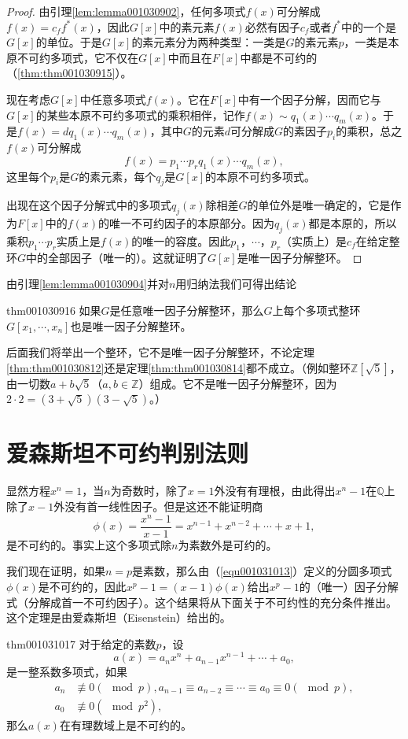 \begin{proof}
由引理\ref{lem:lemma001030902}，任何多项式$f(x)$可分解成$f(x)=c_ff^*(x)$，因此$G[x]$中的素元素$f(x)$必然有因子$c_f$或者$f^*$中的一个是$G[x]$的单位。于是$G[x]$的素元素分为两种类型：一类是$G$的素元素$p$，一类是本原不可约多项式，它不仅在$G[x]$中而且在$F[x]$中都是不可约的（\ref{thm:thm001030915}）。

现在考虑$G[x]$中任意多项式$f(x)$。它在$F[x]$中有一个因子分解，因而它与$G[x]$的某些本原不可约多项式的乘积相伴，记作$f(x)\sim q_1(x)\cdots q_m(x)$。于是$f(x)=dq_1(x)\cdots q_m(x)$，其中$G$的元素$d$可分解成$G$的素因子$p_i$的乘积，总之$f(x)$可分解成
\[
f(x)=p_1 \cdots p_rq_1(x)\cdots q_m(x),
\]
这里每个$p_i$是$G$的素元素，每个$q_j$是$G[x]$的本原不可约多项式。

出现在这个因子分解式中的多项式$q_j(x)$除相差$G$的单位外是唯一确定的，它是作为$F[x]$中的$f(x)$的唯一不可约因子的本原部分。因为$q_j(x)$都是本原的，所以乘积$p_1 \cdots p_r$实质上是$f(x)$的唯一的容度。因此$p_1$，$\cdots$，$p_r$（实质上）是$c_f$在给定整环$G$中的全部因子（唯一的）。这就证明了$G[x]$是唯一因子分解整环。
\end{proof}

由引理\ref{lem:lemma001030904}并对$n$用归纳法我们可得出结论
\begin{theorem}{}{thm001030916}
如果$G$是任意唯一因子分解整环，那么$G$上每个多项式整环$G[x_1, \cdots, x_n]$也是唯一因子分解整环。
\end{theorem}

后面我们将举出一个整环，它不是唯一因子分解整环，不论定理\ref{thm:thm001030812}还是定理\ref{thm:thm001030814}都不成立。（例如整环$\mathbb{Z}[\sqrt{5}]$，由一切数$a+b\sqrt{5}$（$a,b \in \mathbb{Z}$）组成。它不是唯一因子分解整环，因为$2 \cdot 2 = (3+\sqrt{5})(3-\sqrt{5})$。）



\section{爱森斯坦不可约判别法则}\label{subsection0010310}
显然方程$x^n=1$，当$n$为奇数时，除了$x=1$外没有有理根，由此得出$x^n-1$在$\mathbb{Q}$上除了$x-1$外没有首一线性因子。但是这还不能证明商
\begin{equation}\label{equ001031013}
\phi(x)=\frac{x^n-1}{x-1}=x^{n-1}+x^{n-2}+\cdots +x+1,
\end{equation}
是不可约的。事实上这个多项式除$n$为素数外是可约的。

我们现在证明，如果$n=p$是素数，那么由（\ref{equ001031013}）定义的分圆多项式$\phi(x)$是不可约的，因此$x^p-1=(x-1)\phi(x)$给出$x^p-1$的（唯一）因子分解式（分解成首一不可约因子）。这个结果将从下面关于不可约性的充分条件推出。这个定理是由爱森斯坦（Eisenstein）给出的。
\begin{theorem}{}{thm001031017}
对于给定的素数$p$，设
\[
a(x)=a_nx^n+a_{n-1}x^{n-1}+\cdots+a_0,
\]
是一整系数多项式，如果
\[
\begin{aligned}
a_n &\not\equiv 0(\mod{p}),a_{n-1}\equiv a_{n-2}\equiv \cdots \equiv a_0 \equiv 0(\mod{p}),\\
a_0 &\not\equiv 0(\mod{p^2}),
\end{aligned}
\]
那么$a(x)$在有理数域上是不可约的。
\end{theorem}

